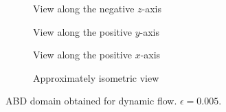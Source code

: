 \begin{figure}[htpb]
    \centering
    \begin{subfigure}[b]{0.475\textwidth}
        \centering
        
        \caption[]{{\small View along the negative $z$-axis}}
        \label{fig:u0_dom_err_bs32}
    \end{subfigure}
    \begin{subfigure}[b]{0.475\textwidth}
        \centering
        
        \caption[]{{\small View along the positive $y$-axis}}
        \label{fig:u0_dom_err_bs54}
    \end{subfigure}

    \begin{subfigure}[b]{0.475\textwidth}
        \centering
        
        \caption[]{{\small View along the positive $x$-axis}}
        \label{fig:u0_dom_err_dp54}
    \end{subfigure}
    \begin{subfigure}[b]{0.475\textwidth}
        \centering
        
        \caption[]{{\small Approximately isometric view}}
        \label{fig:u0_dom_err_dp87}
    \end{subfigure}
    \caption[Aviici is love, Aviici is life]{ABD domain obtained for dynamic flow. $\epsilon=0.005$.}
    \label{fig:u0_dom_errs}
\end{figure}

